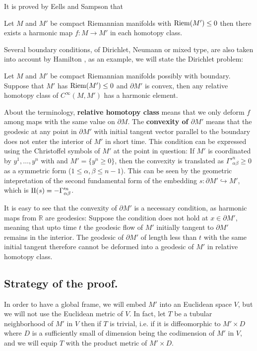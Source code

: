 It is proved by Eells and Sampson \cite{eells_harmonic_1964} that
\begin{theorem}
\label{thm:eells-sampson}
Let \(M\) and \(M'\) be compact Riemannian manifolds with \({\rm Riem } (M') \leq 0\) then there exists a harmonic map \(f: M \longrightarrow M'\) in each homotopy class.
\end{theorem}

Several boundary conditions, of Dirichlet, Neumann or mixed type, are also taken into account by Hamilton
\cite{hamilton_harmonic_1975}, as an example, we will state the Dirichlet problem:

\begin{theorem}[Hamilton]
\label{thm:hamilton-bndry-Dirichlet}
Let \(M\) and \(M'\) be compact Riemannian manifolds possibly with boundary. Suppose
that \(M'\) has \({\rm Riem } (M')\leq 0\) and \(\partial M'\) is convex, then any
relative homotopy class of \(C^\infty(M,M')\) has a harmonic element. 
\end{theorem}

About the terminology, \textbf{relative homotopy class} means that we only deform \(f\) among
maps with the same value on \(\partial M\). The \textbf{convexity of \(\partial M'\)} means
that the geodesic at any point in \(\partial M'\) with initial tangent vector parallel
to the boundary does not enter the interior of \(M'\) in short time. This condition can be expressed
using  the Christoffel symbols of \(M'\) at the point in question: If \(M'\) is
coordinated by \(y^1,\dots,y^n\) with and \(M' =\{y^n\geq 0\}\), then the convexity is
translated as \(\Gamma'^n_{\alpha\beta} \geq 0\) as a symmetric form (\(1\leq\alpha,\beta \leq n-1\)). This can be seen by the geometric intepretation of the second fundamental form of the
embedding \(s: \partial M' \hookrightarrow M'\), which is \(\sff(s) = -\Gamma'^n_{\alpha\beta}\).

It is easy to see that the convexity of \(\partial M'\) is a necessary condition, as
harmonic maps from \(\mathbb{R}\) are geodesics: Suppose the condition does not hold at
\(x\in \partial M'\), meaning that upto time \(t\) the geodesic flow of \(M'\) initially tangent to
\(\partial M'\) remains in the interior. The geodesic of \(\partial M'\) of length
less than \(t\) with the same initial tangent therefore cannot be deformed into a
geodesic of \(M'\) in relative homotopy class. 

\subsection{Strategy of the proof.}
\label{sec:orgab9af17}
In order to have a global frame, we will embed \(M'\) into an Euclidean space \(V\),
but we will not use the Euclidean metric of \(V\). In fact, let \(T\) be a tubular
neighborhood of \(M'\) in \(V\) then if \(T\) is trivial, i.e. if it is diffeomorphic to \(M'\times D\)
where \(D\) is a sufficiently small of dimension being the codimension of \(M'\) in \(V\), and we will equip \(T\) with the product metric of \(M'\times D\). 

